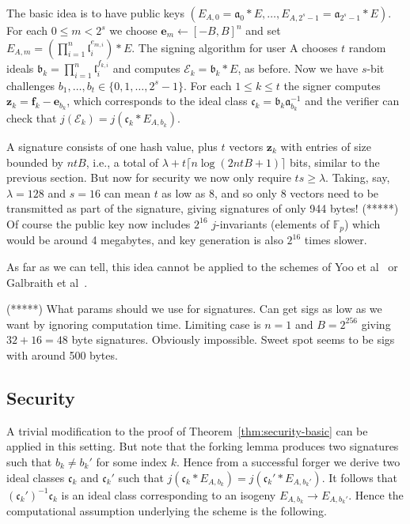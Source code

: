 \documentclass{llncs}
\newcommand{\E}{\mathcal{E}}
\newcommand{\F}{\mathbb{F}}
\renewcommand{\a}{\mathfrak{a}}
\renewcommand{\b}{\mathfrak{b}}
\renewcommand{\c}{\mathfrak{c}}
\renewcommand{\l}{\mathfrak{l}}
\newcommand{\e}{\mathbf{e}}
\newcommand{\f}{\mathbf{f}}
\newcommand{\z}{\mathbf{z}}
\begin{document}
The basic idea is to have public keys $( E_{A,0} = \a_0 * E , \dots , E_{A,2^s-1} = \a_{2^s-1} * E )$.
For each $0 \le m < 2^s$ we choose $\e_m \leftarrow [-B,B]^n$ and set $E_{A,m} = ( \prod_{i=1}^n \l_i^{e_{m,i}} ) * E$.
The signing algorithm for user A chooses $t$ random ideals $\b_k = \prod_{i=1}^n \l_i^{f_{k,i}}$ and computes $\E_k = \b_k * E$, as before.
Now we have $s$-bit challenges $b_1, \dots, b_t \in \{0, 1, \dots, 2^s-1 \}$.
For each $1 \le k \le t$ the signer computes $\z_k = \f_k - \e_{b_k}$, which corresponds to the ideal class $\c_k = \b_k \a_{b_k}^{-1} $ and the verifier can check that $j( \E_k ) = j( \c_k * E_{A, b_k})$.

A signature consists of one hash value, plus $t$ vectors $\z_k$ with entries of size bounded by $ntB$, i.e., a total of $\lambda + t\lceil n\log(2ntB + 1)\rceil$ bits, similar to the previous section.
But now for security we now only require $ts \ge \lambda$.
Taking, say, $\lambda = 128$ and $s = 16$ can mean $t$ as low as 8, and so only 8 vectors need to be transmitted as part of the signature, giving signatures of only 944 bytes!
(*****)
Of course the public key now includes $2^{16}$ $j$-invariants (elements of $\F_p$) which would be around 4 megabytes, and key generation is also $2^{16}$ times slower.


As far as we can tell, this idea cannot be applied to the schemes of Yoo et al~\cite{YAJJS17} or Galbraith et al~\cite{GPS17}.

(*****)
What params should we use for signatures. Can get sigs as low as we want by ignoring computation time.
Limiting case is $n=1$ and $B = 2^{256}$ giving $32 + 16 = 48$ byte signatures. Obviously impossible.
Sweet spot seems to be sigs with around 500 bytes.



\subsection{Security}

A trivial modification to the proof of Theorem~\ref{thm:security-basic} can be applied in this setting. But note that the forking lemma produces two signatures such that $b_k \ne b_k'$ for some index $k$.
Hence from a successful forger we derive two ideal classes $\c_k$ and $\c_k'$ such that $j( \c_k * E_{A, b_k} ) = j( \c_k' * E_{A, b_k'})$. It follows that $(\c_k')^{-1} \c_k$ is an ideal class corresponding to an isogeny $E_{A,b_k} \to E_{A,b_k'}$.
Hence the computational assumption underlying the scheme is the following.
\end{document}
